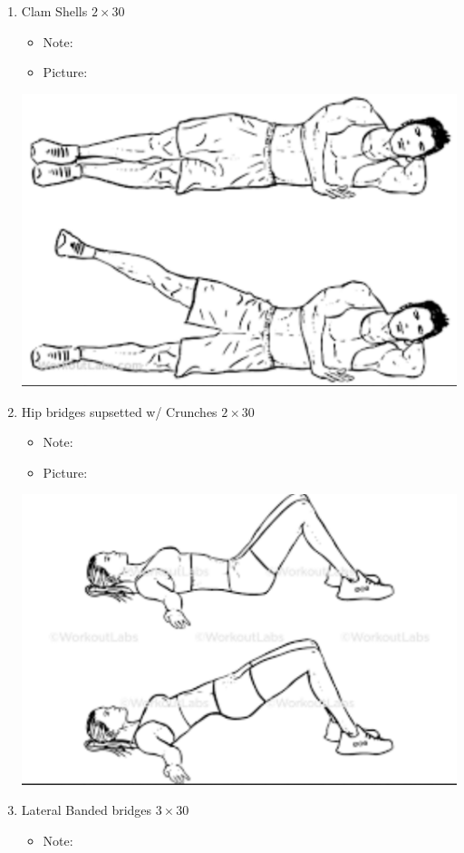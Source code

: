 \documentclass{article}
\begin{document}
\begin{enumerate}

\item Clam Shells $2 \times 30$

    \begin{itemize}

        \item Note: 

        \item Picture:

    \end{itemize}

    \includegraphics[width=.50\textwidth]{laying_leg_abduct.png}

\item Hip bridges supsetted w/ Crunches $2 \times 30$

    \begin{itemize}

        \item Note: 

        \item Picture:

    \end{itemize}

    \includegraphics[width=.50\textwidth]{hip_bridges.png}

\item Lateral Banded bridges  $3 \times 30$

    \begin{itemize}

        \item Note: 


\end{itemize}
\end{enumerate}
\end{document}
